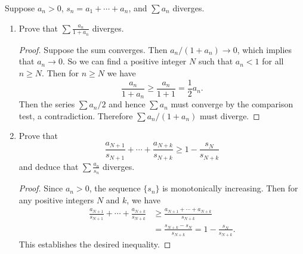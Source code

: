  Suppose $a_n > 0$, $s_n = a_1 + \cdots + a_n$, and
$\sum a_n$ diverges.
\begin{enumerate}
\item Prove that $\displaystyle\sum\frac{a_n}{1 + a_n}$ diverges.
  \begin{proof}
    Suppose the sum converges. Then $a_n/(1 + a_n)\to0$, which implies
    that $a_n\to0$. So we can find a positive integer $N$ such that
    $a_n < 1$ for all $n\geq N$. Then for $n\geq N$ we have
    \begin{equation*}
      \frac{a_n}{1 + a_n} \geq \frac{a_n}{1 + 1} = \frac12a_n.
    \end{equation*}
    Then the series $\sum a_n/2$ and hence $\sum a_n$ must converge by
    the comparison test, a contradiction. Therefore
    $\sum a_n/(1 + a_n)$ must diverge.
  \end{proof}
\item Prove that
  \begin{equation*}
    \frac{a_{N+1}}{s_{N+1}} + \cdots
    + \frac{a_{N+k}}{s_{N+k}} \geq 1 - \frac{s_N}{s_{N+k}}
  \end{equation*}
  and deduce that $\displaystyle\sum\frac{a_n}{s_n}$ diverges.
  \begin{proof}
    Since $a_n > 0$, the sequence $\{s_n\}$ is monotonically
    increasing. Then for any positive integers $N$ and $k$, we have
    \begin{align*}
      \frac{a_{N+1}}{s_{N+1}} + \cdots
      + \frac{a_{N+k}}{s_{N+k}}
      &\geq \frac{a_{N+1}+\cdots+a_{N+k}}{s_{N+k}} \\
      &= \frac{s_{N+k} - s_N}{s_{N+k}} = 1 - \frac{s_N}{s_{N+k}}.
    \end{align*}
    This establishes the desired inequality.


\end{proof}
\end{enumerate}
